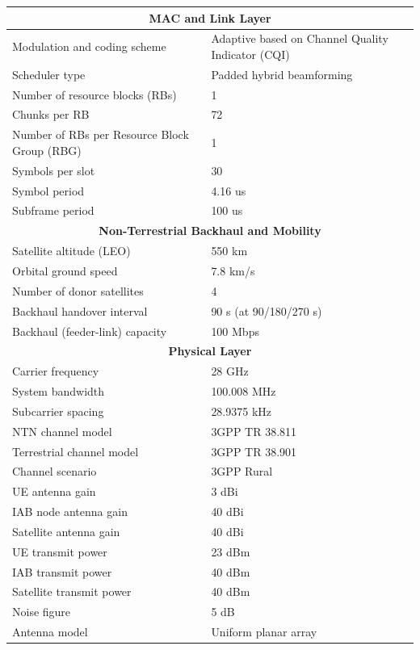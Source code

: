 \documentclass[journal]{IEEEtran}
\begin{document}
\begin{table}[t]
\begin{tabular}{|p{}|p{}|}
\multicolumn{2}{|c|}{\rule{0pt}{2.5ex}\textbf{MAC and Link Layer}} \\ \hline
Modulation and coding scheme & Adaptive based on Channel Quality Indicator (CQI) \\ \hline
Scheduler type & Padded hybrid beamforming \\ \hline
Number of resource blocks (RBs) & 1 \\ \hline
Chunks per RB & 72 \\ \hline
Number of RBs per Resource Block Group (RBG) & 1 \\ \hline
Symbols per slot & 30 \\ \hline
Symbol period & 4.16 us \\ \hline
Subframe period & 100 us \\ \hline

\multicolumn{2}{|c|}{\rule{0pt}{2.5ex}\textbf{Non-Terrestrial Backhaul and Mobility}} \\ \hline
Satellite altitude (LEO) & 550 km \\ \hline
Orbital ground speed & 7.8 km/s \\ \hline
Number of donor satellites & 4 \\ \hline
Backhaul handover interval & 90 s (at 90/180/270 s) \\ \hline
Backhaul (feeder-link) capacity & 100 Mbps~\cite{Kassing2020} \\ \hline

\multicolumn{2}{|c|}{\rule{0pt}{2.5ex}\textbf{Physical Layer}} \\ \hline
Carrier frequency & 28 GHz \\ \hline
System bandwidth & 100.008 MHz \\ \hline
Subcarrier spacing & 28.9375 kHz \\ \hline
NTN channel model & 3GPP TR 38.811  \\ \hline
Terrestrial channel model & 3GPP TR 38.901 \\ \hline
Channel scenario & 3GPP Rural\\ \hline
UE antenna gain & 3 dBi \\ \hline
IAB node antenna gain & 40 dBi \\ \hline
Satellite antenna gain & 40 dBi \\ \hline
UE transmit power & 23 dBm \\ \hline
IAB transmit power & 40 dBm \\ \hline
Satellite transmit power & 40 dBm \\ \hline
Noise figure & 5 dB \\ \hline
Antenna model & Uniform planar array \\ \hline
\end{tabular}
\end{table}
\end{document}
